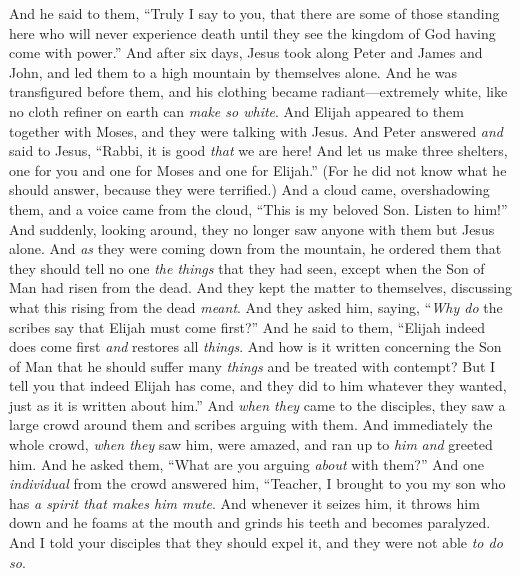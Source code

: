 \begin{biblechapter} %
\verse And he said to them, “Truly I say to you, that there are some of those standing here who will never experience death until they see the kingdom of God having come with power.”
 And after six days, Jesus took along Peter and James and John, and led them to a high mountain by themselves alone. And he was transfigured before them,
\verse and his clothing became radiant—extremely white, like no cloth refiner on earth can \textit{make so white}.
\verse And Elijah appeared to them together with Moses, and they were talking with Jesus.
\verse And Peter answered \textit{and} said to Jesus, “Rabbi, it is good \textit{that} we are here! And let us make three shelters, one for you and one for Moses and one for Elijah.”
\verse (For he did not know what he should answer, because they were terrified.)
\verse And a cloud came, overshadowing them, and a voice came from the cloud, “This is my beloved Son. Listen to him!”
\verse And suddenly, looking around, they no longer saw anyone with them but Jesus alone.
\verse And \textit{as} they were coming down from the mountain, he ordered them that they should tell no one \textit{the things} that they had seen, except when the Son of Man had risen from the dead.
\verse And they kept the matter to themselves, discussing what this rising from the dead \textit{meant}.
\verse And they asked him, saying, “\textit{Why do} the scribes say that Elijah must come first?”
\verse And he said to them, “Elijah indeed does come first \textit{and} restores all \textit{things}. And how is it written concerning the Son of Man that he should suffer many \textit{things} and be treated with contempt?
\verse But I tell you that indeed Elijah has come, and they did to him whatever they wanted, just as it is written about him.”
 And \textit{when they} came to the disciples, they saw a large crowd around them and scribes arguing with them.
\verse And immediately the whole crowd, \textit{when they} saw him, were amazed, and ran up to \textit{him} \textit{and} greeted him.
\verse And he asked them, “What are you arguing \textit{about} with them?”
\verse And one \textit{individual} from the crowd answered him, “Teacher, I brought to you my son who has \textit{a spirit that makes him mute}.
\verse And whenever it seizes him, it throws him down and he foams at the mouth and grinds his teeth and becomes paralyzed. And I told your disciples that they should expel it, and they were not able \textit{to do so}.

\end{biblechapter}
